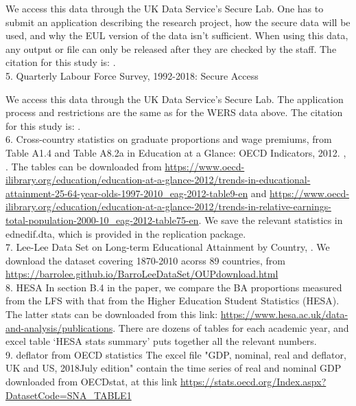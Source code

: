 \documentclass[12pt]{article}
\begin{document}
We access this data through the UK Data Service's Secure Lab. One has to submit an application describing the research project, how the secure data will be used, and why the EUL version of the data isn't sufficient. When using this data, any output or file can only be released after they are checked by the staff. The citation for this study is: \cite{wers}.\\

5. 	Quarterly Labour Force Survey, 1992-2018: Secure Access

We access this data through the UK Data Service's Secure Lab. The application process and restrictions are the same as for the WERS data above. The citation for this study is: \cite{qlfssa}.\\

6. Cross-country statistics on graduate proportions and wage premiums, from Table A1.4 and Table A8.2a in Education at a Glance: OECD Indicators, 2012. \cite{oecd1}, \cite{oecd2}. The tables can be downloaded from \url{https://www.oecd-ilibrary.org/education/education-at-a-glance-2012/trends-in-educational-attainment-25-64-year-olds-1997-2010_eag-2012-table9-en} and \url{https://www.oecd-ilibrary.org/education/education-at-a-glance-2012/trends-in-relative-earnings-total-population-2000-10_eag-2012-table75-en}. We save the relevant statistics in ednedif.dta, which is provided in the replication package.\\

7. Lee-Lee Data Set on Long-term Educational Attainment by Country, \cite{lee2016}. We download the dataset covering 1870-2010 acorss 89 countries, from \url{https://barrolee.github.io/BarroLeeDataSet/OUPdownload.html}\\

8. HESA
	In section B.4 in the paper, we compare the BA proportions measured from the LFS with that from the Higher Education Student Statistics (HESA). The latter stats can be downloaded from this link: \url{https://www.hesa.ac.uk/data-and-analysis/publications}.  There are dozens of tables for each academic year, and excel table ‘HESA stats summary’ puts together all the relevant numbers.\\

9. deflator from OECD statistics 
The excel file "GDP, nominal, real and deflator,  UK and US, 2018July edition" contain the time series of real and nominal GDP downloaded from OECDstat, at this link \url{https://stats.oecd.org/Index.aspx?DatasetCode=SNA_TABLE1}\\
\end{document}
